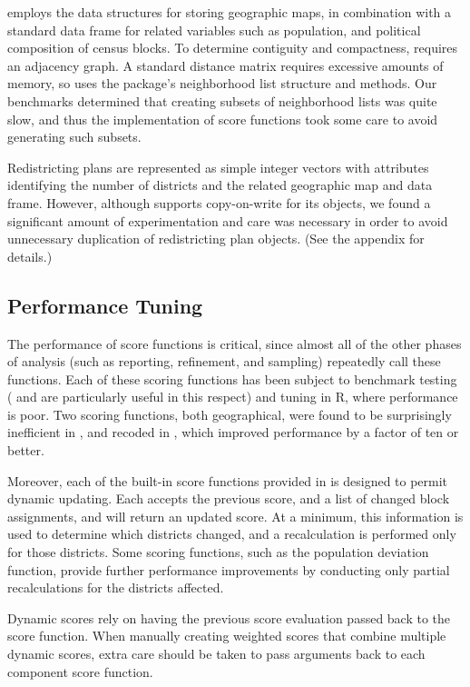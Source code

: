 \documentclass[article]{JSSstyle/jss}
\begin{document}
 employs the  \citep{Lewin07} data structures for storing 
geographic maps, in combination with a standard data frame for related variables such as 
population, and political composition of census blocks. To determine contiguity and compactness, 
 requires an adjacency graph. A standard distance matrix requires excessive amounts of memory, 
so  uses the  \citep{Bivand07} package's neighborhood list structure and methods. 
Our benchmarks determined that creating subsets of neighborhood lists was quite slow, and 
thus the implementation of score functions took some care to avoid generating such subsets.

Redistricting plans are represented as simple integer vectors with attributes 
identifying the number of districts and the related geographic map and data frame.  
However, although  supports copy-on-write for its objects, we found a 
significant amount of experimentation and care was necessary in order to avoid unnecessary duplication of redistricting plan objects. (See the appendix for details.) 

\subsection{Performance Tuning} 

The performance of score functions is critical, since almost all of the other phases of 
 analysis (such as reporting, refinement, and sampling) repeatedly call these functions.
Each of these scoring functions has been subject to benchmark testing ( and  are particularly useful in this respect) and tuning in R, where performance 
is poor. Two scoring functions, both geographical, were found to be surprisingly inefficient in , 
and recoded in , which improved performance by a factor of ten or better. 

Moreover, each of the built-in score functions provided in  is designed to permit dynamic updating.  Each accepts the 
previous score, and a list of changed block assignments, and will return 
an updated score. At a minimum, this information is used to determine which districts changed, and 
a recalculation is performed only for those districts. Some scoring functions, such as the 
population deviation function, provide further performance improvements by 
conducting only partial recalculations for the districts affected. 

Dynamic scores rely on having the previous score evaluation passed 
back to the score function. When manually creating weighted scores that 
combine multiple dynamic scores, extra care should be taken to pass 
arguments back to each component score function.
\end{document}
